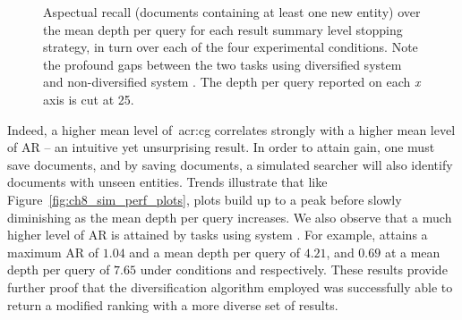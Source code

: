 \begin{figure}[p!]
    \centering
    \caption[AR \emph{what-if} performance plots]{Aspectual recall (documents containing at least one new entity) over the mean depth per query for each result summary level stopping strategy, in turn over each of the four experimental conditions. Note the profound gaps between the two tasks using diversified system  and non-diversified system . The depth per query reported on each \emph{x} axis is cut at 25.}
    \label{fig:ch8_sim_ar_plots}
\end{figure}

Indeed, a higher mean level of~\gls{acr:cg} correlates strongly with a higher mean level of AR -- an intuitive yet unsurprising result. In order to attain gain, one must save documents, and by saving documents, a simulated searcher will also identify documents with unseen entities. Trends illustrate that like Figure~\ref{fig:ch8_sim_perf_plots}, plots build up to a peak before slowly diminishing as the mean depth per query increases. We also observe that a much higher level of AR is attained by tasks using system . For example,  attains a maximum AR of $1.04$ and a mean depth per query of $4.21$, and $0.69$ at a mean depth per query of $7.65$ under conditions  and  respectively. These results provide further proof that the diversification algorithm employed was successfully able to return a modified ranking with a more diverse set of results.

